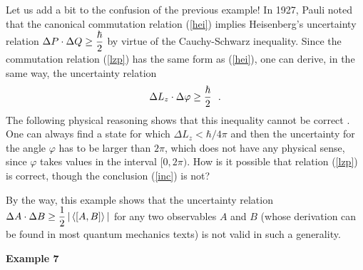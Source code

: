 \documentclass[a4wide,12pt]{report}
\begin{document}
\medskip

Let us add a bit to the confusion of the previous example!
In 1927, Pauli noted that the 
canonical commutation relation (\ref{hei}) implies 
Heisenberg's uncertainty relation 
$\Delta P \cdot \Delta Q  \geq \displaystyle{\hbar \over 2}$
by virtue of the Cauchy-Schwarz inequality.
Since the commutation relation (\ref{lzp}) has the same form as 
(\ref{hei}), one can derive, in the same way, the 
uncertainty relation 
\begin{equation}
\label{inc}
\Delta L_z \cdot \Delta \varphi \geq \displaystyle{\hbar \over 2}
\ \ .
\end{equation}
The following physical reasoning shows that this inequality 
cannot be correct \cite{ju, car, gap}.
One can always find a state for which 
$\Delta L_z  < \hbar /  4\pi$
and then the uncertainty for the angle $\varphi$ has to be larger 
than $2 \pi$, which does not have any physical sense, since 
$\varphi$ takes values in the interval $[0,2 \pi )$.
How is it possible that relation (\ref{lzp}) is correct,
though the conclusion (\ref{inc}) is not?  

By the way, this example shows that the 
uncertainty relation 
$\Delta A\cdot \Delta B  \geq \displaystyle{1 \over 2} \,
| \, \langle [ A,B] \rangle \, |$ 
for any two observables $A$ and $B$ (whose derivation can be found 
in most quantum mechanics texts) is not valid in such a generality. 

 
\bigskip
 
\noindent 
{\bf Example 7}
 
\medskip
\end{document}
